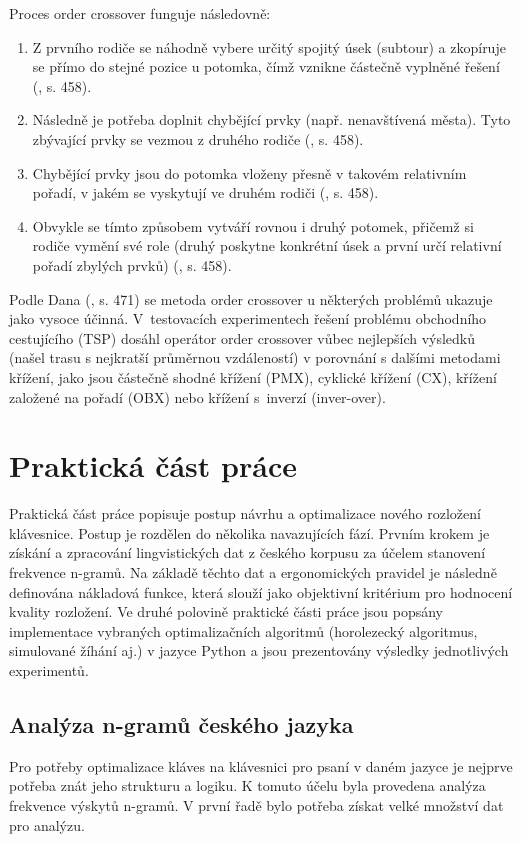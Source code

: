 \documentclass[a4paper, twoside, 12pt, czech]{article}
\begin{document}
Proces order crossover funguje následovně:

\begin{enumerate}
    \item Z prvního rodiče se náhodně vybere určitý spojitý úsek (subtour) a zkopíruje se přímo do stejné pozice u potomka, čímž vznikne částečně vyplněné řešení (\cite{evolutionaryOptimizationAlgos}, s. 458).
    \item Následně je potřeba doplnit chybějící prvky (např. nenavštívená města). Tyto zbývající prvky se vezmou z druhého rodiče (\cite{evolutionaryOptimizationAlgos}, s. 458).
    \item Chybějící prvky jsou do potomka vloženy přesně v takovém relativním pořadí, v jakém se vyskytují ve druhém rodiči (\cite{evolutionaryOptimizationAlgos}, s. 458).
    \item Obvykle se tímto způsobem vytváří rovnou i druhý potomek, přičemž si rodiče vymění své role (druhý poskytne konkrétní úsek a první určí relativní pořadí zbylých prvků) (\cite{evolutionaryOptimizationAlgos}, s. 458).
\end{enumerate}

Podle Dana (\cite{evolutionaryOptimizationAlgos}, s. 471) se metoda order crossover
u některých problémů ukazuje jako vysoce účinná. 
V~testovacích experimentech řešení problému obchodního cestujícího (TSP) dosáhl 
operátor order crossover vůbec nejlepších výsledků (našel trasu s nejkratší průměrnou 
vzdáleností) v porovnání s dalšími metodami křížení, jako jsou částečně shodné 
křížení (PMX), cyklické křížení (CX), křížení založené na pořadí (OBX) nebo křížení 
s~inverzí (inver-over).

\newpage
\section{Praktická část práce}
Praktická část práce popisuje postup návrhu a optimalizace nového rozložení 
klávesnice. Postup je rozdělen do několika navazujících fází. Prvním krokem je 
získání a zpracování lingvistických dat z českého korpusu za účelem stanovení 
frekvence n-gramů. Na základě těchto dat a ergonomických pravidel je následně 
definována nákladová funkce, která slouží jako objektivní kritérium pro 
hodnocení kvality rozložení. Ve druhé polovině praktické části práce jsou 
popsány implementace vybraných optimalizačních algoritmů (horolezecký 
algoritmus, simulované žíhání aj.) v jazyce Python a jsou prezentovány výsledky 
jednotlivých experimentů.
\subsection{Analýza n-gramů českého jazyka}
Pro potřeby optimalizace kláves na klávesnici pro psaní v daném jazyce je nejprve 
potřeba znát jeho strukturu a logiku. %
K tomuto účelu byla provedena analýza frekvence výskytů n-gramů. V první řadě 
bylo potřeba získat velké množství dat pro analýzu.
\end{document}
